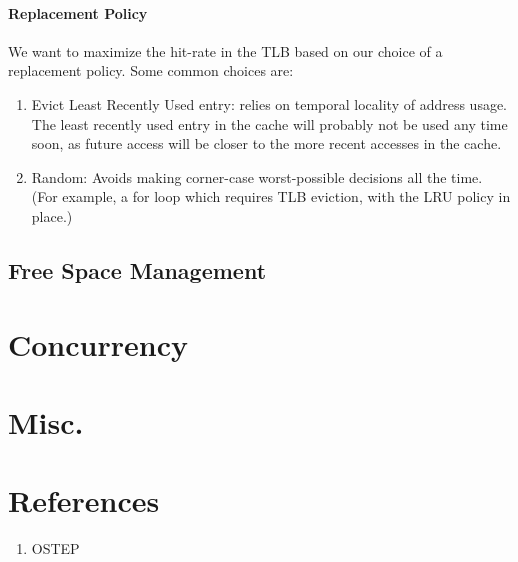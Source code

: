 \documentclass[10pt]{report}
\begin{document}
\subsubsection{Replacement Policy}
We want to maximize the hit-rate in the TLB based on our 
choice of a replacement policy. Some common choices are:
\begin{enumerate}
\item Evict Least Recently Used entry: relies on temporal locality 
of address usage. The least recently used entry in the cache will
probably not be used any time soon, as future access will be closer
to the more recent accesses in the cache.
\item Random: Avoids making corner-case worst-possible decisions all 
the time. (For example, a for loop which requires TLB eviction, with the LRU policy in place.) 
\end{enumerate}
\section{Free Space Management}
\chapter{Concurrency}
\chapter{Misc.}
\chapter{References}
\begin{enumerate}
\item OSTEP
\end{enumerate}
\end{document}
